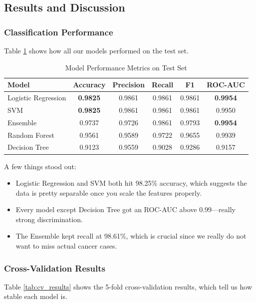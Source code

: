 \documentclass[12pt]{article}
\begin{document}
\subsection{Results and Discussion}

\subsubsection{Classification Performance}

Table \ref{tab:results} shows how all our models performed on the test set.

\begin{table}[H]
\centering
\caption{Model Performance Metrics on Test Set}
\label{tab:results}
\begin{tabular}{|l|c|c|c|c|c|}
\hline
\textbf{Model} & \textbf{Accuracy} & \textbf{Precision} & \textbf{Recall} & \textbf{F1} & \textbf{ROC-AUC} \\ \hline
Logistic Regression & \textbf{0.9825} & 0.9861 & 0.9861 & 0.9861 & \textbf{0.9954} \\ \hline
SVM & \textbf{0.9825} & 0.9861 & 0.9861 & 0.9861 & 0.9950 \\ \hline
Ensemble & 0.9737 & 0.9726 & 0.9861 & 0.9793 & \textbf{0.9954} \\ \hline
Random Forest & 0.9561 & 0.9589 & 0.9722 & 0.9655 & 0.9939 \\ \hline
Decision Tree & 0.9123 & 0.9559 & 0.9028 & 0.9286 & 0.9157 \\ \hline
\end{tabular}
\end{table}

A few things stood out:
\begin{itemize}
    \item Logistic Regression and SVM both hit 98.25\% accuracy, which suggests the data is pretty separable once you scale the features properly.
    \item Every model except Decision Tree got an ROC-AUC above 0.99---really strong discrimination.
    \item The Ensemble kept recall at 98.61\%, which is crucial since we really do not want to miss actual cancer cases.
\end{itemize}

\subsubsection{Cross-Validation Results}

Table \ref{tab:cv_results} shows the 5-fold cross-validation results, which tell us how stable each model is.
\end{document}
